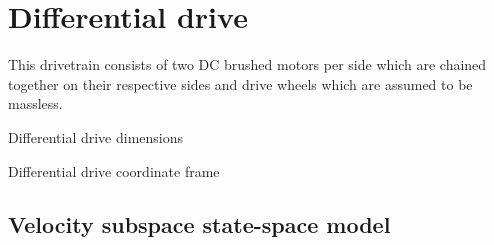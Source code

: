 \section{Differential drive}
\label{sec:ss_model_differential_drive}

This drivetrain consists of two DC brushed motors per side which are chained
together on their respective sides and drive wheels which are assumed to be
massless.
\begin{bookfigure}
  \begin{bookminifig}{2}
    
    \caption{Differential drive dimensions}
  \end{bookminifig}
  \begin{bookminifig}{2}
    
    \caption{Differential drive coordinate frame}
  \end{bookminifig}
\end{bookfigure}

\subsection{Velocity subspace state-space model}

